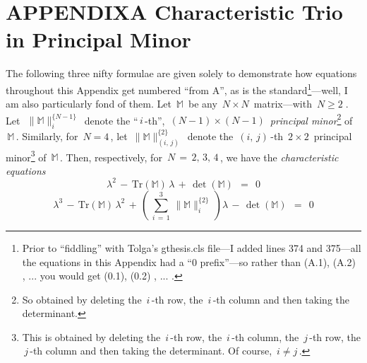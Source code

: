 \documentclass[11pt]{gthesis2}  %
\begin{document}
\section{APPENDIX\;\;\;A Characteristic Trio in Principal Minor}
\label{sec:nifty3}
%
%
\indent The following three nifty formulae are given solely to
demonstrate how equations throughout this Appendix get numbered
``from A'', as is the standard\footnote{Prior to ``fiddling'' with
Tolga's gthesis.cls file---I added lines 374 and 375---all the
equations in this Appendix had a ``0 prefix''---so rather than
(A.1), (A.2) , ... you would get (0.1), (0.2) , ... .
\vspace{.2cm}}---well, I am also particularly fond of them. Let
$\,\mathbb{M}\,$ be any $\,N\times N\,$ matrix---with $\,N \geq
2\;$. Let $\,\,\|\mathbb{M}\|^{\{N-1\}}_{i}\,$ denote the
``$\,i\,$-th'', $\,(N-1)\times (N-1)\,$ \emph{principal
minor}\footnote{So obtained by deleting the $\,i\,$-th row, the
$\,i\,$-th column and then taking the determinant. \vspace{.2cm}}
of $\,\mathbb{M}\,$. Similarly,
%
%
for $\,N = 4\,$, let $\,\|\mathbb{M}\|^{\{2\}}_{(i,\,j)}\,$ denote
the $\,(i,\,j)\,$-th $\,2\times 2\,$ principal minor\footnote{This
is obtained by deleting the $\,i\,$-th row, the $\,i\,$-th column,
the $\,j\,$-th row, the $\,j\,$-th column and then taking the
determinant. Of course, $\,i \neq j\,$. \vspace{.2cm}} of
$\,\mathbb{M}\,$. Then, respectively, for $\,N\,=\,2,\,3,\,4\,$,
we have the \emph{characteristic equations}
\\
%
\begin{equation}\label{eq:nifty1}
%
\lambda^{2}\,-\,\text{Tr}(\mathbb{M})\,\lambda \,+\,
\det(\mathbb{M})\;\,=\;\,0
%
\end{equation}
%
\vspace{.2cm}
%
\begin{equation}\label{eq:nifty2}
%
\lambda^{3}\,-\,\text{Tr}(\mathbb{M})\,\lambda^{2} \,+\,
\left(\,\sum_{i\,=\,1}^{3}\,\|\mathbb{M}\|^{\{2\}}_{i}\,
\right)\lambda \,-\,\det(\mathbb{M})\;\,=\;\,0
%
\end{equation}
%
\vspace{.2cm}
\end{document}
